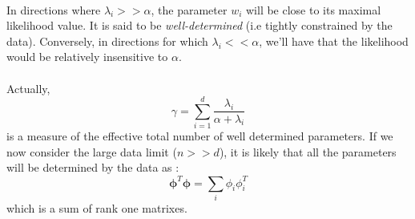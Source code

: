 \documentclass[a4paper]{article}
\newcommand\bphi{\boldsymbol{\phi}}
\begin{document}
{{			\paragraph{} In directions where $\lambda_i >> \alpha$, the parameter $w_i$ will be close to its maximal likelihood value. It is said to be \emph{well-determined} (i.e tightly constrained by the data). Conversely, in directions for which $\lambda_i << \alpha$, we'll have that the likelihood would be relatively insensitive to $\alpha$. 
			
			\paragraph{} Actually, 
			$$
				\gamma = \sum_{i=1}^d \frac{\lambda_i}{\alpha + \lambda_i}
			$$
			is a measure of the effective total number of well determined parameters. If we now consider the large data limit ($n>>d$), it is likely that all the parameters will be determined by the data as : 
			$$
				\bphi^T\bphi = \sum_i \phi_i \phi_i^T
			$$
			which is a sum of rank one matrixes. 
		}
	}
\end{document}
